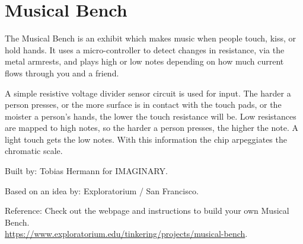 \section{Musical Bench}
The Musical Bench is an exhibit which makes music when people touch, kiss, or hold hands. It uses a micro-controller to detect changes in resistance, via the metal armrests, and plays high or low notes depending on how much current flows through you and a friend.

A simple resistive voltage divider sensor circuit is used for input. The harder a person presses, or the more surface is in contact with the touch pads, or the moister a person's hands, the lower the touch resistance will be. Low resistances are mapped to high notes, so the harder a person presses, the higher the note. A light touch gets the low notes. With this information the chip arpeggiates the chromatic scale.

\begin{sectcredits}

\item[Built by:] Tobias Hermann for IMAGINARY.
\item[Based on an idea by:] Exploratorium / San Francisco.

\item[Reference:] Check out the webpage and instructions to build your own Musical Bench.\\
\url{https://www.exploratorium.edu/tinkering/projects/musical-bench}.

\end{sectcredits}
